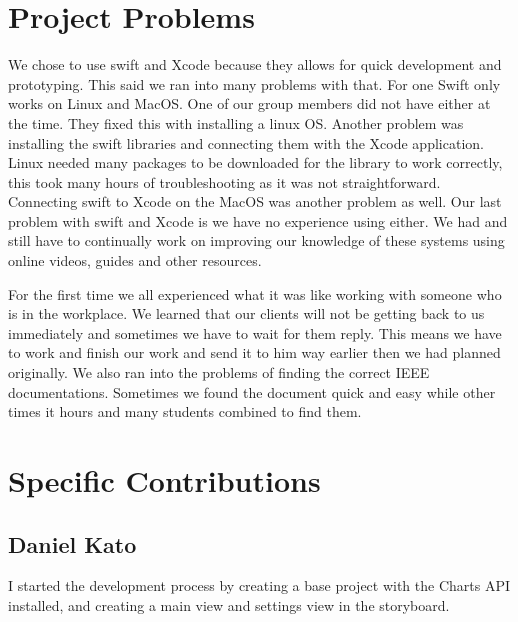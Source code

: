 \documentclass[onecolumn, draftclsnofoot,10pt, compsoc]{IEEEtran}
\begin{document}
\section{Project Problems}
We chose to use swift and Xcode because they allows for quick development and prototyping.
This said we ran into many problems with that. For one Swift only works on Linux and MacOS.
One of our group members did not have either at the time. They fixed this with installing a linux OS.
Another problem was installing the swift libraries and connecting them with the Xcode application.
Linux needed many packages to be downloaded for the library to work correctly, this took many hours of troubleshooting as it was not straightforward.
Connecting swift to Xcode on the MacOS was another problem as well.
Our last problem with swift and Xcode is we have no experience using either.
We had and still have to continually work on improving our knowledge of these systems using online videos, guides and other resources.

For the first time we all experienced what it was like working with someone who is in the workplace.
We learned that our clients will not be getting back to us immediately and sometimes we have to wait for them reply.
This means we have to work and finish our work and send it to him way earlier then we had planned originally.
We also ran into the problems of finding the correct IEEE documentations.
Sometimes we found the document quick and easy while other times it hours and many students combined to find them.

\section{Specific Contributions}
\subsection{Daniel Kato}
    I started the development process by creating a base project with the Charts API installed, and creating a main view and settings view in the storyboard.
\end{document}
